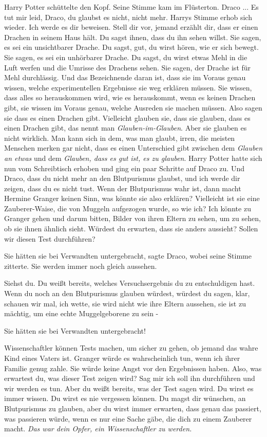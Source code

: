 Harry Potter schüttelte den Kopf. Seine Stimme kam im Flüsterton.
\glqq{}Draco ... Es tut mir leid, Draco, du glaubst es nicht, nicht mehr.\grqq{}
Harrys Stimme erhob sich wieder. \glqq{}Ich werde es dir beweisen. Stell dir
vor, jemand erzählt dir, dass er einen Drachen in seinem Haus hält. Du sagst
ihnen, dass du ihn sehen willst. Sie sagen, es sei ein unsichtbarer Drache. Du
sagst, gut, du wirst hören, wie er sich bewegt. Sie sagen, es sei ein unhörbarer
Drache. Du sagst, du wirst etwas Mehl in die Luft werfen und die Umrisse des
Drachens sehen. Sie sagen, der Drache ist für Mehl durchlässig. Und das
Bezeichnende daran ist, dass sie im Voraus genau wissen, welche experimentellen
Ergebnisse sie weg erklären müssen. Sie wissen, dass alles so herauskommen wird,
wie es herauskommt, wenn es keinen Drachen gibt, sie wissen im Voraus genau,
welche Ausreden sie machen müssen. Also sagen sie dass es einen Drachen gibt.
Vielleicht glauben sie, dass sie glauben, dass es einen Drachen gibt, das nennt
man \emph{Glauben-im-Glauben}. Aber sie glauben es nicht wirklich. Man kann sich
in dem, was man glaubt, irren, die meisten Menschen merken gar nicht, dass es
einen Unterschied gibt zwischen dem \emph{Glauben an etwas} und dem
\emph{Glauben, dass es gut ist, es zu glauben}.\grqq{} Harry Potter hatte sich
nun vom Schreibtisch erhoben und ging ein paar Schritte auf Draco zu. \glqq{}Und
Draco, dass du nicht mehr an den Blutpurismus glaubst, und ich werde dir zeigen,
dass du es nicht tust. Wenn der Blutpurismus wahr ist, dann macht Hermine
Granger keinen Sinn, was könnte sie also erklären? Vielleicht ist sie eine
Zauberer-Waise, die von Muggeln aufgezogen wurde, so wie ich? Ich könnte zu
Granger gehen und darum bitten, Bilder von ihren Eltern zu sehen, um zu sehen,
ob sie ihnen ähnlich sieht. Würdest du erwarten, dass sie anders aussieht?
Sollen wir diesen Test durchführen?\grqq{}

\glqq{}Sie hätten sie bei Verwandten untergebracht\grqq{}, sagte Draco, wobei
seine Stimme zitterte. \glqq{}Sie werden immer noch gleich aussehen.\grqq{}

\glqq{}Siehst du. Du weißt bereits, welches Versuchsergebnis du zu entschuldigen
hast. Wenn du noch an den Blutpurismus glauben würdest, würdest du sagen, klar,
schauen wir mal, ich wette, sie wird nicht wie ihre Eltern aussehen, sie ist zu
mächtig, um eine echte Muggelgeborene zu sein -\grqq{}

\glqq{}Sie hätten sie bei Verwandten untergebracht!\grqq{}

\glqq{}Wissenschaftler können Tests machen, um sicher zu gehen, ob jemand das
wahre Kind eines Vaters ist. Granger würde es wahrscheinlich tun, wenn ich ihrer
Familie genug zahle. Sie würde keine Angst vor den Ergebnissen haben. Also, was
erwartest du, was dieser Test zeigen wird? Sag mir ich soll ihn durchführen und
wir werden es tun. Aber du weißt bereits, was der Test sagen wird. Du wirst es
immer wissen. Du wirst es nie vergessen können. Du magst dir wünschen, an
Blutpurismus zu glauben, aber du wirst immer erwarten, dass genau das passiert,
was passieren würde, wenn es nur eine Sache gäbe, die dich zu einem Zauberer
macht. \emph{Das war dein Opfer, ein Wissenschaftler zu werden.}\grqq{}

